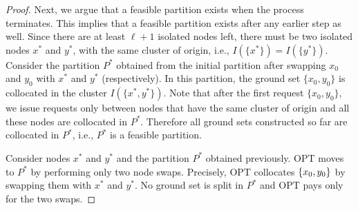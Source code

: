 \documentclass[a4paper,anonymous,USenglish]{lipics-v2019}
\newcommand{\OPT}{\textsc{OPT}\xspace}
\newcommand{\ALG}{\textsc{ALG}\xspace}
\DeclarePairedDelimiter\set{\{}{\}}
\begin{document}
\begin{proof}
	  Next, we argue that a feasible partition exists when the process terminates.
	 This implies that a feasible partition exists after any earlier step as well.
	 Since there are at least $\ell+1$ isolated nodes left,
	 there must be two isolated nodes $x^*$ and $y^*$,
	  with the same cluster of origin,
	 i.e., $I(\{x^*\}) = I(\{y^*\})$.
	 Consider the partition $P^*$
	  obtained from the initial partition after swapping $x_0$ and $y_0$
	 with $x^*$ and $y^*$ (respectively).
	 In this partition,
	 the ground set $\{x_0,y_0\}$ is collocated in the cluster $I(\{x^*,y^*\})$.
	 Note that after the first request $\{x_0,y_0\}$,
	   we issue requests only between nodes that have the same cluster of origin and
	   all these nodes are collocated in $P^*$.
	 Therefore all ground sets constructed so far are collocated in  $P^*$,
	 i.e., $P^*$ is a feasible partition.
	
%

	Consider  nodes $x^*$ and $y^*$ and the partition $P^*$ obtained previously.
	\OPT moves to $P^*$ by performing only two node swaps.
	Precisely, \OPT collocates $\set{x_0,y_0}$ 
	by swapping them with $x^*$ and $y^*$.
	No ground set is split in $P^*$ and
	 \OPT pays only for the two swaps.


\end{proof}
\end{document}
